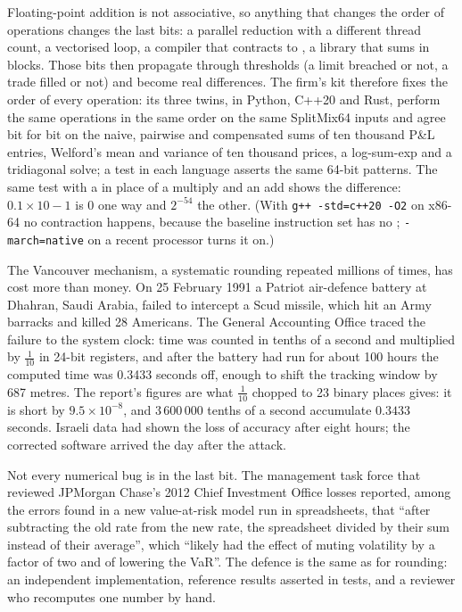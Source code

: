 Floating-point addition is not associative, so anything that changes the order of operations changes the last bits: a parallel reduction with a different thread count, a vectorised loop, a
compiler that contracts to , a library that sums in blocks. Those bits then propagate through thresholds (a limit breached or not, a trade filled or not) and become real
differences. The firm's kit therefore fixes the order of every operation: its three twins, in Python, C++20 and Rust, perform the same operations in the same order on the same SplitMix64 inputs
and agree bit for bit on the naive, pairwise and compensated sums of ten thousand P\&L entries, Welford's mean and variance of ten thousand prices, a log-sum-exp and a tridiagonal solve; a
test in each language asserts the same 64-bit patterns. The same test with a  in place of a multiply and an add shows the difference: $0.1 \times 10 - 1$ is 0 one way and $2^{-54}$
the other. (With \texttt{g++ -std=c++20 -O2} on x86-64 no contraction happens, because the baseline instruction set has no ; \texttt{-march=native} on a recent processor
turns it on.)

The Vancouver mechanism, a systematic rounding repeated millions of times, has cost more than money. On 25 February 1991 a Patriot air-defence battery at Dhahran, Saudi Arabia, failed to
intercept a Scud missile, which hit an Army barracks and killed 28 Americans. The General Accounting Office traced the failure to the system clock: time was counted in tenths of a second and
multiplied by $\frac1{10}$ in 24-bit registers, and after the battery had run for about 100 hours the computed time was 0.3433 seconds off, enough to shift the tracking window by 687 metres. The
report's figures are what $\frac1{10}$ chopped to 23 binary places gives: it is short by $9.5 \times 10^{-8}$, and $3\,600\,000$ tenths of a second accumulate $0.3433$ seconds. Israeli data had shown
the loss of accuracy after eight hours; the corrected software arrived the day after the attack.

Not every numerical bug is in the last bit. The management task force that reviewed JPMorgan Chase's 2012 Chief Investment Office losses reported, among the errors found in a new value-at-risk
model run in spreadsheets, that ``after subtracting the old rate from the new rate, the spreadsheet divided by their sum instead of their average'', which ``likely had the effect of muting
volatility by a factor of two and of lowering the VaR''. The defence is the same as for rounding: an independent implementation, reference results asserted in tests, and a reviewer who
recomputes one number by hand.

